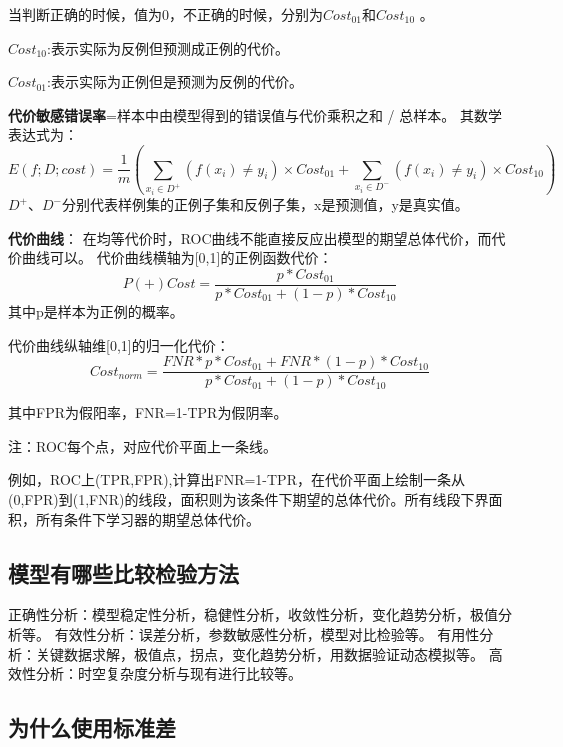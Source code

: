  

当判断正确的时候，值为0，不正确的时候，分别为$Cost_{01}​$和$Cost_{10}​$
。

$Cost_{10}$:表示实际为反例但预测成正例的代价。

$Cost_{01}$:表示实际为正例但是预测为反例的代价。

\textbf{代价敏感错误率}=样本中由模型得到的错误值与代价乘积之和 /
总样本。 其数学表达式为： \[
E(f;D;cost)=\frac{1}{m}\left( \sum_{x_{i} \in D^{+}}({f(x_i)\neq y_i})\times Cost_{01}+ \sum_{x_{i} \in D^{-}}({f(x_i)\neq y_i})\times Cost_{10}\right)
\]
$D^{+}、D^{-}​$分别代表样例集的正例子集和反例子集，x是预测值，y是真实值。

\textbf{代价曲线}：
在均等代价时，ROC曲线不能直接反应出模型的期望总体代价，而代价曲线可以。
代价曲线横轴为{[}0,1{]}的正例函数代价： \[
P(+)Cost=\frac{p*Cost_{01}}{p*Cost_{01}+(1-p)*Cost_{10}}
\] 其中p是样本为正例的概率。

代价曲线纵轴维{[}0,1{]}的归一化代价： \[
Cost_{norm}=\frac{FNR*p*Cost_{01}+FNR*(1-p)*Cost_{10}}{p*Cost_{01}+(1-p)*Cost_{10}}
\]

其中FPR为假阳率，FNR=1-TPR为假阴率。

注：ROC每个点，对应代价平面上一条线。

例如，ROC上(TPR,FPR),计算出FNR=1-TPR，在代价平面上绘制一条从(0,FPR)到(1,FNR)的线段，面积则为该条件下期望的总体代价。所有线段下界面积，所有条件下学习器的期望总体代价。

 

\subsection{模型有哪些比较检验方法}\label{ux6a21ux578bux6709ux54eaux4e9bux6bd4ux8f83ux68c0ux9a8cux65b9ux6cd5}

正确性分析：模型稳定性分析，稳健性分析，收敛性分析，变化趋势分析，极值分析等。
有效性分析：误差分析，参数敏感性分析，模型对比检验等。
有用性分析：关键数据求解，极值点，拐点，变化趋势分析，用数据验证动态模拟等。
高效性分析：时空复杂度分析与现有进行比较等。

\subsection{为什么使用标准差}\label{ux4e3aux4ec0ux4e48ux4f7fux7528ux6807ux51c6ux5dee}

